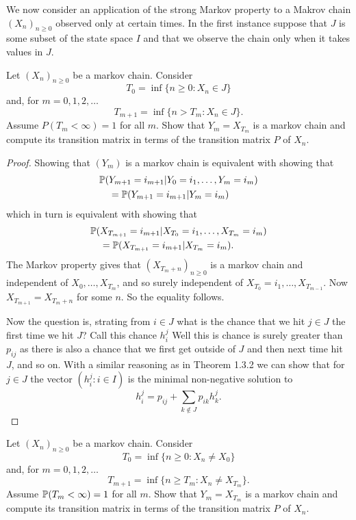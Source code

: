 We now consider an application of the strong Markov property to a Makrov chain \((X_{n})_{n\geq 0}\) observed only at certain times. In the first instance suppose that \(J\) is some subset of the state space \(I\) and that we observe the chain only when it takes values in \(J\).

\begin{prop}
Let \((X_{n})_{n\geq 0}\) be a markov chain. Consider
\[
T_{0}=\inf\{n\geq 0:X_{n}\in J\}
\]
and, for \(m=0,1,2,\ldots \)
\[
T_{m+1}=\inf\{n>T_{m}:X_{n}\in J\}.
\]
Assume \(P(T_{m}<\infty )=1\) for all \(m\). Show that \(Y_{m}=X_{T_{m}}\) is a markov chain and compute its transition matrix in terms of the transition matrix $P$ of $X_{n}$.
\end{prop}
\newpage
\begin{proof}
Showing that \((Y_{m})\) is a markov chain is equivalent with showing that
\begin{align*}
\Bbb{P}(&Y_{m+1}=i_{m+1} | Y_{0}=i_{1},\ldots ,Y_{m}=i_{m} ) \\
&=\Bbb{P}(Y_{m+1}=i_{m+1} | Y_{m}=i_{m})
\end{align*}
which in turn is equivalent with showing that
\begin{align*}
\Bbb{P}(&X_{T_{m+1}}=i_{m+1} | X_{T_{0}} =i_{1},\ldots ,X_{T_{m}}=i_{m} ) \\
&=\Bbb{P}(X_{T_{m+1}}=i_{m+1} | X_{T_{m}}=i_{m} ).
\end{align*}
The Markov property gives that \((X_{T_{m}+n})_{n\geq 0}\) is a markov chain and independent of $X_{0},\ldots ,X_{T_{m}}$, and so surely independent of \(X_{T_{0}} =i_{1},\ldots ,X_{T_{m-1}}\). Now \(X_{T_{m+1}}=X_{T_{m}+n}\) for some $n$. So the equality follows.

Now the question is, strating from $i\in J$ what is the chance that we hit \(j\in J\) the first time we hit \(J\)? Call this chance \(h_{i}^j\) Well this is chance is surely greater than \(p_{ij}\) as there is also a chance that we first get outside of \(J\) and then next time hit \(J\), and so on. With a similar reasoning as in Theorem 1.3.2 we can show that for \(j\in J\) the vector \((h_{i}^j : i\in I)\) is the minimal non-negative solution to
\[
h_{i}^j=p_{ij}+\sum _{k\not\in J}p_{ik}h_{k}^j.
\]

\end{proof}

\begin{prop}
Let \((X_{n})_{n\geq 0}\) be a markov chain. Consider
\[
T_{0}=\inf\{n\geq 0:X_{n}\neq X_{0}\}
\]
and, for \(m=0,1,2,\ldots \)
\[
T_{m+1}=\inf\{n\geq T_{m}:X_{n}\neq X_{T_{m}}\}.
\]
Assume \(\Bbb{P}(T_{m}<\infty )=1\) for all \(m\). Show that \(Y_{m}=X_{T_{m}}\) is a markov chain and compute its transition matrix in terms of the transition matrix $P$ of $X_{n}$.
\end{prop}

